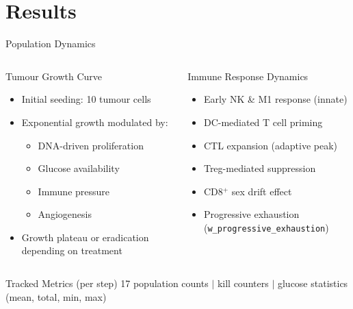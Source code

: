 \documentclass[aspectratio=169,10pt]{beamer}
\begin{document}
\section{Results}

\begin{frame}{Population Dynamics}
  \begin{columns}[T]
    \begin{block}{Tumour Growth Curve}
      \begin{itemize}
        \item Initial seeding: 10 tumour cells
        \item Exponential growth modulated by:
          \begin{itemize}
            \item DNA-driven proliferation
            \item Glucose availability
            \item Immune pressure
            \item Angiogenesis
          \end{itemize}
        \item Growth plateau or eradication depending on treatment
      \end{itemize}
    \end{block}

    \begin{block}{Immune Response Dynamics}
      \begin{itemize}
        \item Early NK \& M1 response (innate)
        \item DC-mediated T cell priming
        \item CTL expansion (adaptive peak)
        \item Treg-mediated suppression
        \item CD8$^+$ sex drift effect
        \item Progressive exhaustion (\texttt{w\_progressive\_exhaustion})
      \end{itemize}
    \end{block}
  \end{columns}
  \vspace{0.5em}
  \begin{block}{Tracked Metrics (per step)}
    \centering\small
    17 population counts \quad$|$ kill counters \quad$|$ glucose statistics (mean, total, min, max)
  \end{block}
\end{frame}
\end{document}
